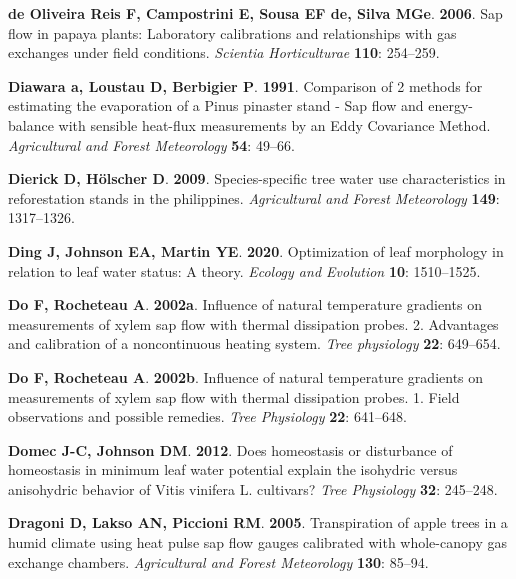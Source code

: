 \documentclass[11pt,twoside]{reedthesis}
\begin{document}
\hypertarget{ref-DeOliveiraReis2006}{}
\textbf{\textnormal{de Oliveira Reis F}, \textnormal{Campostrini E},
\textnormal{Sousa EF de}, \textnormal{Silva MGe}}. \textbf{2006}. Sap
flow in papaya plants: Laboratory calibrations and relationships with
gas exchanges under field conditions. \emph{Scientia Horticulturae}
\textbf{110}: 254--259.

\hypertarget{ref-Diawara1991}{}
\textbf{\textnormal{Diawara a}, \textnormal{Loustau D},
\textnormal{Berbigier P}}. \textbf{1991}. Comparison of 2 methods for
estimating the evaporation of a Pinus pinaster stand - Sap flow and
energy-balance with sensible heat-flux measurements by an Eddy
Covariance Method. \emph{Agricultural and Forest Meteorology}
\textbf{54}: 49--66.

\hypertarget{ref-Dierick2009}{}
\textbf{\textnormal{Dierick D}, \textnormal{Hölscher D}}. \textbf{2009}.
Species-specific tree water use characteristics in reforestation stands
in the philippines. \emph{Agricultural and Forest Meteorology}
\textbf{149}: 1317--1326.

\hypertarget{ref-ding_optimization_2020}{}
\textbf{\textnormal{Ding J}, \textnormal{Johnson EA}, \textnormal{Martin
YE}}. \textbf{2020}. Optimization of leaf morphology in relation to leaf
water status: A theory. \emph{Ecology and Evolution} \textbf{10}:
1510--1525.

\hypertarget{ref-Do2002}{}
\textbf{\textnormal{Do F}, \textnormal{Rocheteau A}}. \textbf{2002a}.
Influence of natural temperature gradients on measurements of xylem sap
flow with thermal dissipation probes. 2. Advantages and calibration of a
noncontinuous heating system. \emph{Tree physiology} \textbf{22}:
649--654.

\hypertarget{ref-Do2002b}{}
\textbf{\textnormal{Do F}, \textnormal{Rocheteau A}}. \textbf{2002b}.
Influence of natural temperature gradients on measurements of xylem sap
flow with thermal dissipation probes. 1. Field observations and possible
remedies. \emph{Tree Physiology} \textbf{22}: 641--648.

\hypertarget{ref-domec_does_2012}{}
\textbf{\textnormal{Domec J-C}, \textnormal{Johnson DM}}. \textbf{2012}.
Does homeostasis or disturbance of homeostasis in minimum leaf water
potential explain the isohydric versus anisohydric behavior of Vitis
vinifera L. cultivars? \emph{Tree Physiology} \textbf{32}: 245--248.

\hypertarget{ref-Dragoni2005}{}
\textbf{\textnormal{Dragoni D}, \textnormal{Lakso AN},
\textnormal{Piccioni RM}}. \textbf{2005}. Transpiration of apple trees
in a humid climate using heat pulse sap flow gauges calibrated with
whole-canopy gas exchange chambers. \emph{Agricultural and Forest
Meteorology} \textbf{130}: 85--94.
\end{document}
